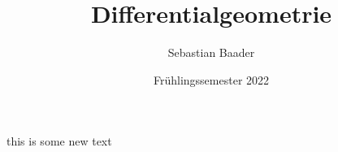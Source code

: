 \documentclass[11pt]{report}
\theoremstyle{definition}
\begin{document}
\renewcommand{\thechapter}{\Roman{chapter}}
\renewcommand{\thesection}{\arabic{section}}

\title{Differentialgeometrie}
\author{Sebastian Baader}
\date{Frühlingssemester 2022}
\maketitle



\tableofcontents






this is some new text

%
%
\end{document}
